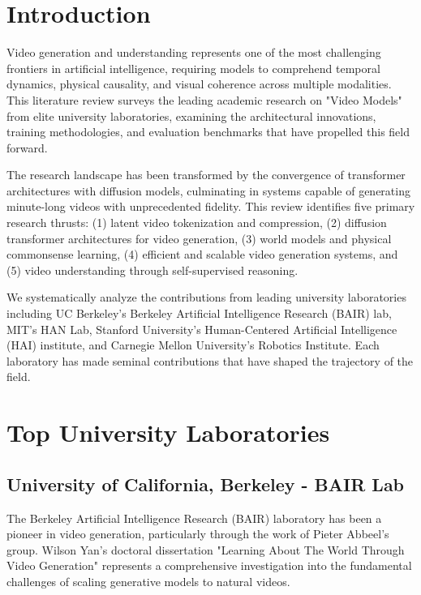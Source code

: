 \section{Introduction}

Video generation and understanding represents one of the most challenging frontiers in artificial intelligence, requiring models to comprehend temporal dynamics, physical causality, and visual coherence across multiple modalities. This literature review surveys the leading academic research on "Video Models" from elite university laboratories, examining the architectural innovations, training methodologies, and evaluation benchmarks that have propelled this field forward.

The research landscape has been transformed by the convergence of transformer architectures with diffusion models, culminating in systems capable of generating minute-long videos with unprecedented fidelity. This review identifies five primary research thrusts: (1) latent video tokenization and compression, (2) diffusion transformer architectures for video generation, (3) world models and physical commonsense learning, (4) efficient and scalable video generation systems, and (5) video understanding through self-supervised reasoning.

We systematically analyze the contributions from leading university laboratories including UC Berkeley's Berkeley Artificial Intelligence Research (BAIR) lab, MIT's HAN Lab, Stanford University's Human-Centered Artificial Intelligence (HAI) institute, and Carnegie Mellon University's Robotics Institute. Each laboratory has made seminal contributions that have shaped the trajectory of the field.

\section{Top University Laboratories}

\subsection{University of California, Berkeley - BAIR Lab}

The Berkeley Artificial Intelligence Research (BAIR) laboratory has been a pioneer in video generation, particularly through the work of Pieter Abbeel's group. Wilson Yan's doctoral dissertation "Learning About The World Through Video Generation" represents a comprehensive investigation into the fundamental challenges of scaling generative models to natural videos.

